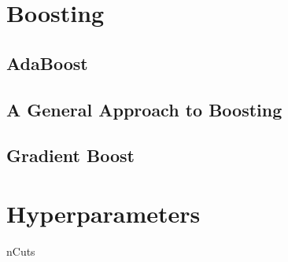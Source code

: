 
\section{Boosting}\label{sec:bdt:boosting}

\subsection{AdaBoost}\label{sub:bdt:boosting:adaboost}

\subsection{A General Approach to Boosting}\label{sub:bdt:boosting:general}

\subsection{Gradient Boost}\label{sub:bdt:boosting:gradient_boost}

\section{Hyperparameters}\label{sec:bdt:hyperparameters}

nCuts
